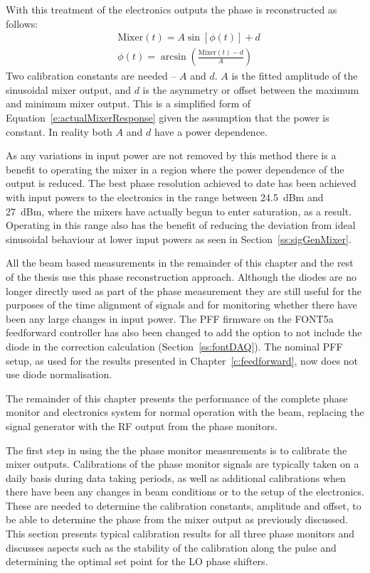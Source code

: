 With this treatment of the electronics outputs the phase is reconstructed as follows:
\begin{align}
&\mathrm{Mixer}(t) = A\sin[\phi(t)] + d \\
&\phi(t) = \arcsin\left(\frac{\mathrm{Mixer}(t)-d}{A}\right)
\label{e:phaseRecUsed}
\end{align}
Two calibration constants are needed -- \(A\) and \(d\). \(A\) is the fitted amplitude of the sinusoidal mixer output, and \(d\) is the asymmetry or offset between the maximum and minimum mixer output. This is a simplified form of Equation~\ref{e:actualMixerResponse} given the assumption that the power is constant. In reality both \(A\) and \(d\) have a power dependence.

As any variations in input power are not removed by this method there is a benefit to operating the mixer in a region where the power dependence of the output is reduced. The best phase resolution achieved to date has been achieved with input powers to the electronics in the range between 24.5~dBm and 27~dBm, where the mixers have actually begun to enter saturation, as a result. Operating in this range also has the benefit of reducing the deviation from ideal sinusoidal behaviour at lower input powers as seen in Section~\ref{ss:sigGenMixer}.

All the beam based measurements in the remainder of this chapter and the rest of the thesis use this phase reconstruction approach. Although the diodes are no longer directly used as part of the phase measurement they are still useful for the purposes of the time alignment of signals and for monitoring whether there have been any large changes in input power. The PFF firmware on the FONT5a feedforward controller has also been changed to add the option to not include the diode in the correction calculation (Section~\ref{ss:fontDAQ}). The nominal PFF setup, as used for the results presented in Chapter~\ref{c:feedforward}, now does not use diode normalisation.


The remainder of this chapter presents the performance of the complete phase monitor and electronics system for normal operation with the beam, replacing the signal generator with the RF output from the phase monitors. 

The first step in using the the phase monitor measurements is to calibrate the mixer outputs. Calibrations of the phase monitor signals are typically taken on a daily basis during data taking periods, as well as additional calibrations when there have been any changes in beam conditions or to the setup of the electronics. These are needed to determine the calibration constants, amplitude and offset, to be able to determine the phase from the mixer output as previously discussed. This section presents typical calibration results for all three phase monitors and discusses aspects such as the stability of the calibration along the pulse and determining the optimal set point for the LO phase shifters. 

